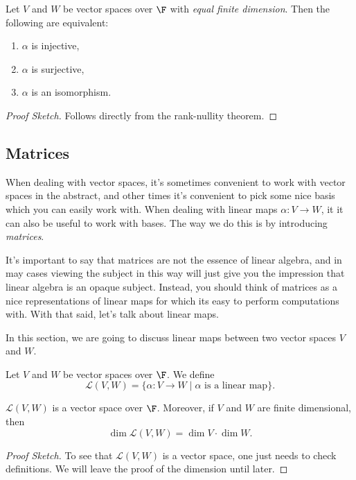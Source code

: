 \begin{lemma}
    Let $V$ and $W$ be vector spaces over $\F$ with \emph{equal finite dimension}. Then the following are equivalent: 
    \begin{enumerate}[label=(\roman*)]
        \item $\alpha$ is injective,
        \item $\alpha$ is surjective,
        \item $\alpha$ is an isomorphism.
    \end{enumerate}
\end{lemma}
\begin{proof}[Proof Sketch]
    Follows directly from the rank-nullity theorem.
\end{proof}

\subsection{Matrices}

When dealing with vector spaces, it's sometimes convenient to work with vector spaces in the abstract, and other times it's convenient to pick some nice basis which you can easily work with.
When dealing with linear maps $\alpha: V \rightarrow W$, it it can also be useful to work with bases. The way we do this is by introducing \emph{matrices}.

It's important to say that matrices are not the essence of linear algebra, and in may cases viewing the subject in this way will just give you the impression that linear algebra is an opaque subject. Instead, you should think of matrices as a nice representations of linear maps for which its easy to perform computations with.
With that said, let's talk about linear maps.

In this section, we are going to discuss linear maps between two vector spaces $V$ and $W$.

\begin{definition}
    Let $V$ and $W$ be vector spaces over $\F$. We define
    $$
    \mathcal{L}(V, W) = \{\alpha: V \rightarrow W \mid \alpha \text{ is a linear map}\}.
    $$
\end{definition}

\begin{proposition}
    $\mathcal{L}(V, W)$ is a vector space over $\F$. Moreover, if $V$ and $W$ are finite dimensional, then
    $$
    \dim \mathcal{L}(V, W) = \dim V \cdot \dim W.
    $$
\end{proposition}
\begin{proof}[Proof Sketch]    
    To see that $\mathcal{L}(V, W)$ is a vector space, one just needs to check definitions. We will leave the proof of the dimension until later.
\end{proof}

